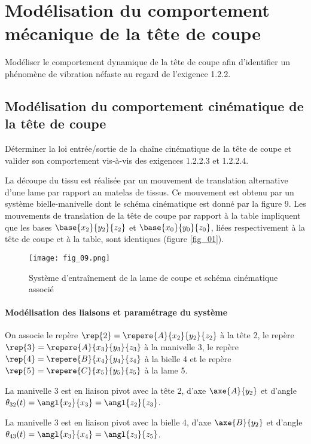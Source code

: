 \section{Modélisation du comportement mécanique de la tête de coupe}
\begin{obj}
Modéliser le comportement dynamique de la tête de coupe afin d’identifier un phénomène de vibration néfaste au regard de l’exigence 1.2.2.
\end{obj}

\subsection*{Modélisation du comportement cinématique de la tête de coupe}
\begin{obj}
Déterminer la loi entrée/sortie de la chaîne cinématique de la tête de coupe et valider son comportement vis-à-vis des exigences 1.2.2.3 et 1.2.2.4.
\end{obj}

La découpe du tissu est réalisée par un mouvement de translation alternative d’une lame par rapport au matelas de tissus. Ce mouvement est obtenu par un système bielle-manivelle dont le schéma cinématique est donné par la figure 9. Les mouvements de translation de la tête de coupe par rapport à la table impliquent que les bases $\base{x_2}{y_2}{z_2}$ et $\base{x_0}{y_0}{z_0}$, liées respectivement à la tête de coupe et à la table, sont identiques (figure \ref{fig_01}).


\begin{figure}[!h]
\texttt{[image: fig\_09.png]}
\caption{Système d’entraînement de la lame de coupe et schéma cinématique associé\label{fig_09}}
\end{figure}

\paragraph*{Modélisation des liaisons et paramétrage du système}

On associe le repère  $\rep{2}=\repere{A}{x_2}{y_2}{z_2}$ à la tête 2, le repère $\rep{3}=\repere{A}{x_3}{y_3}{z_3}$ à la manivelle 3, le repère $\rep{4}=\repere{B}{x_4}{y_4}{z_4}$ à la bielle 4 et le repère $\rep{5}=\repere{C}{x_5}{y_5}{z_5}$ à la lame 5.

La manivelle 3 est en liaison pivot avec la tête 2, d’axe $\axe{A}{y_2}$ et d’angle $\theta_{32} (t)= \angl{x_2}{x_3} = \angl{z_2}{z_3} $.

La manivelle 3 est en liaison pivot avec la bielle 4, d’axe $\axe{B}{y_2}$ et d’angle $\theta_{43} (t)= \angl{x_3}{x_4} = \angl{z_3}{z_5} $.

